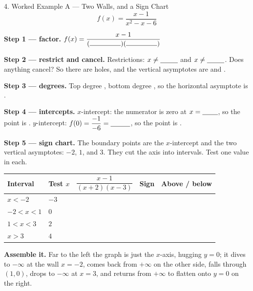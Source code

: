 \documentclass[10pt]{article}
\begin{document}
\begin{notesbox}{4. Worked Example A --- Two Walls, and a Sign Chart}
\[ f(x)=\frac{x-1}{x^2-x-6} \]

\textbf{Step 1 --- factor.} \quad $f(x)=\dfrac{x-1}{(\rule{1.6cm}{0.4pt})(\rule{1.6cm}{0.4pt})}$

\vspace{3pt}
\textbf{Step 2 --- restrict and cancel.} Restrictions: $x\neq\blank{0.9cm}$ and $x\neq\blank{0.9cm}$.
Does anything cancel? \blank{1.0cm} \; So there are \blank{0.7cm} holes, and the vertical asymptotes
are \blank{1.4cm} and \blank{1.4cm}.

\vspace{3pt}
\textbf{Step 3 --- degrees.} Top degree \blank{0.7cm}, bottom degree \blank{0.7cm}, so the horizontal
asymptote is \blank{1.4cm}.

\vspace{3pt}
\textbf{Step 4 --- intercepts.} $x$-intercept: the numerator is zero at $x=\blank{0.8cm}$, so the point
is \blank{1.4cm}. \; $y$-intercept: $f(0)=\dfrac{-1}{-6}=\blank{1.0cm}$, so the point is
\blank{1.4cm}.

\vspace{4pt}
\textbf{Step 5 --- sign chart.} The boundary points are the $x$-intercept and the two vertical
asymptotes: $-2$, $1$, and $3$. They cut the axis into \blank{0.7cm} intervals. Test one value in each.

\vspace{2pt}
\renewcommand{\arraystretch}{1.5}
\begin{tabularx}{\linewidth}{|C{2.6cm}|C{1.6cm}|C{4.0cm}|C{1.6cm}|X|}
\hline
{}
\textbf{Interval} & \textbf{Test $x$} & \textbf{$\dfrac{x-1}{(x+2)(x-3)}$} & \textbf{Sign} &
\textbf{Above / below} \\ \hline
$x<-2$    & $-3$ & & & \\ \hline
$-2<x<1$  & $0$  & & & \\ \hline
$1<x<3$   & $2$  & & & \\ \hline
$x>3$     & $4$  & & & \\ \hline
\end{tabularx}

\vspace{4pt}
\textbf{Assemble it.} Far to the left the graph is just \blank{1.6cm} the $x$-axis, hugging $y=0$;
it dives to $-\infty$ at the wall $x=-2$, comes back from $+\infty$ on the other side, falls through
$(1,0)$, drops to $-\infty$ at $x=3$, and returns from $+\infty$ to flatten onto $y=0$ on the right.


\end{notesbox}
\end{document}
